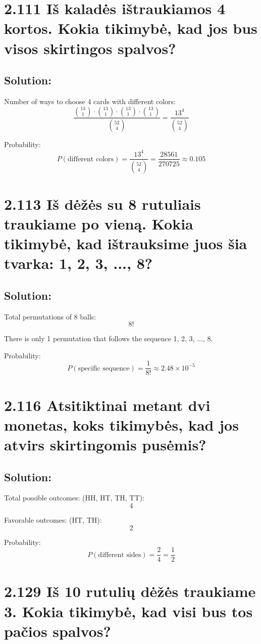 \documentclass{article}
\begin{document}
{\section*{2.111 Iš kaladės ištraukiamos 4 kortos. Kokia tikimybė, kad jos bus visos skirtingos spalvos?}
\subsection*{Solution:}
Number of ways to choose 4 cards with different colors:
\[
\frac{\binom{13}{1} \cdot \binom{13}{1} \cdot \binom{13}{1} \cdot \binom{13}{1}}{\binom{52}{4}} = \frac{13^4}{\binom{52}{4}}
\]

Probability:
\[
P(\text{different colors}) = \frac{13^4}{\binom{52}{4}} = \frac{28561}{270725} \approx 0.105
\]

\section*{2.113 Iš dėžės su 8 rutuliais traukiame po vieną. Kokia tikimybė, kad ištrauksime juos šia tvarka: 1, 2, 3, ..., 8?}
\subsection*{Solution:}
Total permutations of 8 balls:
\[
8!
\]

There is only 1 permutation that follows the sequence 1, 2, 3, ..., 8.

Probability:
\[
P(\text{specific sequence}) = \frac{1}{8!} \approx 2.48 \times 10^{-5}
\]

\section*{2.116 Atsitiktinai metant dvi monetas, koks tikimybės, kad jos atvirs skirtingomis pusėmis?}
\subsection*{Solution:}
Total possible outcomes: (HH, HT, TH, TT):
\[
4
\]

Favorable outcomes: (HT, TH):
\[
2
\]

Probability:
\[
P(\text{different sides}) = \frac{2}{4} = \frac{1}{2}
\]

\section*{2.129 Iš 10 rutulių dėžės traukiame 3. Kokia tikimybė, kad visi bus tos pačios spalvos?}
}
\end{document}
